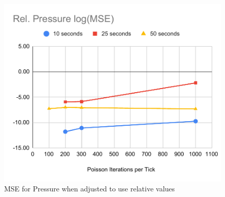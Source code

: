 \begin{figure}
    \centering
    \includegraphics[width=0.5\linewidth]{Ch62Results/figures/temp_rel_pressure_mse.pdf}
    \caption{MSE for Pressure when adjusted to use relative values}
    \label{fig:results:mse_rel_pressure}
\end{figure}